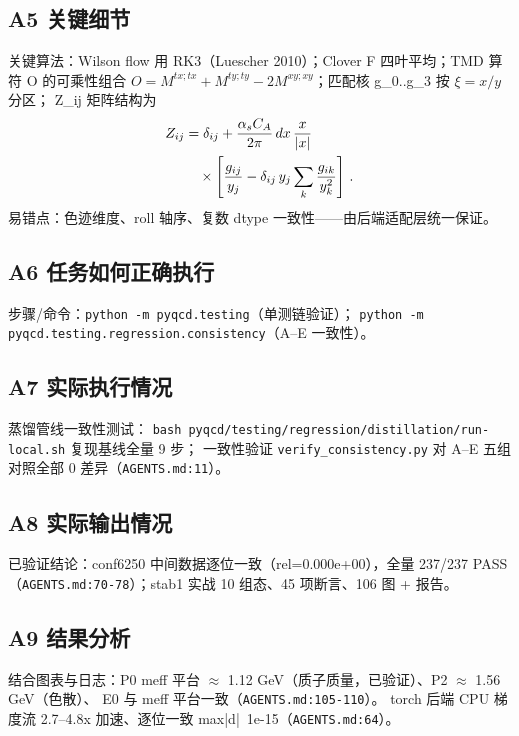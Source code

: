 \documentclass[UTF8]{ctexart}
\begin{document}
\subsection{A5 关键细节}
关键算法：Wilson flow 用 RK3（Luescher 2010）；Clover F 四叶平均；TMD 算符 O 的可乘性组合
$O = M^{tx;tx} + M^{ty;ty} - 2M^{xy;xy}$；匹配核 g\_0..g\_3 按 $\xi=x/y$ 分区；
Z\_ij 矩阵结构为
\begin{align}
Z_{ij} &= \delta_{ij} + \frac{\alpha_s C_A}{2\pi}\,dx\,\frac{x}{|x|} \notag\\
&\quad\times\left[\frac{g_{ij}}{y_j} - \delta_{ij}\,y_j\sum_k \frac{g_{ik}}{y_k^2}\right]\,.
\end{align}
易错点：色迹维度、roll 轴序、复数 dtype 一致性——由后端适配层统一保证。

\subsection{A6 任务如何正确执行}
步骤/命令：\textcolor{evidence}{\nolinkurl{python -m pyqcd.testing}}（单测链验证）；
\textcolor{evidence}{\nolinkurl{python -m pyqcd.testing.regression.consistency}}（A–E 一致性）。

\subsection{A7 实际执行情况}
蒸馏管线一致性测试：
\nolinkurl{bash pyqcd/testing/regression/distillation/run-local.sh} 复现基线全量 9 步；
一致性验证 \nolinkurl{verify\_consistency.py} 对 A–E 五组对照全部 0 差异（\textcolor{evidence}{\nolinkurl{AGENTS.md:11}}）。

\subsection{A8 实际输出情况}
已验证结论：conf6250 中间数据逐位一致（rel=0.000e+00），全量 237/237 PASS
（\textcolor{evidence}{\nolinkurl{AGENTS.md:70-78}}）；stab1 实战 10 组态、45 项断言、106 图 + 报告。

\subsection{A9 结果分析}
结合图表与日志：P0 meff 平台 $\approx$ 1.12 GeV（质子质量，已验证）、P2 $\approx$ 1.56 GeV（色散）、
E0 与 meff 平台一致（\textcolor{evidence}{\nolinkurl{AGENTS.md:105-110}}）。
torch 后端 CPU 梯度流 2.7–4.8x 加速、逐位一致 max|d|~1e-15（\textcolor{evidence}{\nolinkurl{AGENTS.md:64}}）。
\end{document}
